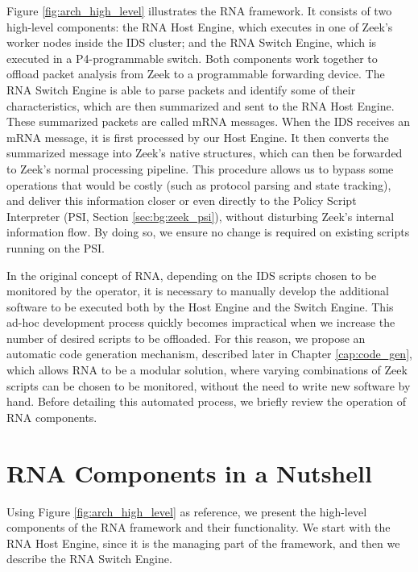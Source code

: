 Figure \ref{fig:arch_high_level} illustrates the RNA framework. It consists of two high-level components: the RNA Host Engine, which executes in one of Zeek's worker nodes inside the IDS cluster; and the RNA Switch Engine, which is executed in a P4-programmable switch. Both components work together to offload packet analysis from Zeek to a programmable forwarding device. The RNA Switch Engine is able to parse packets and identify some of their characteristics, which are then summarized and sent to the RNA Host Engine. These summarized packets are called mRNA messages. When the IDS receives an mRNA message, it is first processed by our Host Engine. It then converts the summarized message into Zeek's native structures, which can then be forwarded to Zeek's normal processing pipeline. This procedure allows us to bypass some operations that would be costly (such as protocol parsing and state tracking), and deliver this information closer or even directly to the Policy Script Interpreter (PSI, Section \ref{sec:bg:zeek_psi}), without disturbing Zeek's internal information flow. By doing so, we ensure no change is required on existing scripts running on the PSI.

In the original concept of RNA, depending on the IDS scripts chosen to be monitored by the operator, it is necessary to manually develop the additional software to be executed both by the Host Engine and the Switch Engine. This ad-hoc development process quickly becomes impractical when we increase the number of desired scripts to be offloaded. For this reason, we propose an automatic code generation mechanism, described later in Chapter \ref{cap:code_gen}, which allows RNA to be a modular solution, where varying combinations of Zeek scripts can be chosen to be monitored, without the need to write new software by hand. Before detailing this automated process, we briefly review the operation of RNA components.

\section{RNA Components in a Nutshell}
\label{sec:rna:overview}

Using Figure \ref{fig:arch_high_level} as reference, we present the high-level components of the RNA framework and their functionality. We start with the RNA Host Engine, since it is the managing part of the framework, and then we describe the RNA Switch Engine.

